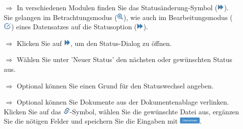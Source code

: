 \documentclass{article}
\begin{document}
\begin{multicols}{2}
\begin{tcolorbox}[colback=blue!5,colframe=blue!40!black,title=Status ändern]
\begin{itemize}
  \item[$\Longrightarrow$] In verschiedenen Modulen finden Sie das Statusänderung-Symbol (\includegraphics[height=10pt]{Icons/Status_aendern.png}). Sie gelangen im Betrachtungsmodus (\includegraphics[height=10pt]{Icons/Lupe.png}), wie auch im Bearbeitungsmodus (\includegraphics[height=10pt]{Icons/bearbeiten.png}) eines Datensatzes auf die Statusoption (\includegraphics[height=10pt]{Icons/Status_aendern.png}).
  \item[$\Longrightarrow$] Klicken Sie auf \includegraphics[height=10pt]{Icons/Status_aendern.png}, um den Status-Dialog zu öffnen.
  \item[$\Longrightarrow$] Wählen Sie unter 'Neuer Status' den nächsten oder gewünschten Status aus.
  \item[$\Longrightarrow$] Optional können Sie einen Grund für den Statuswechsel angeben.
  \item[$\Longrightarrow$] Optional können Sie Dokumente aus der Dokumentenablage verlinken. Klicken Sie auf das \includegraphics[height=10pt]{Icons/Link.png}-Symbol, wählen Sie die gewünschte Datei aus, ergänzen Sie die nötigen Felder und speichern Sie die Eingaben mit \includegraphics[height=10pt]{Icons/B_Uebernehmen.jpg}.

\end{itemize}
\end{tcolorbox}


\end{multicols}

\end{document}
